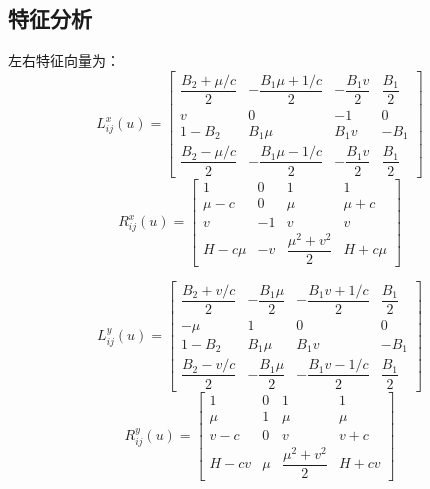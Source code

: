 \documentclass{article}
\numberwithin{equation}{section}    %
\begin{document}
\subsection{特征分析}

左右特征向量为\cite{RN95}：
\begin{equation}
    L_{i j}^{x}(u)=\begin{bmatrix}
        \dfrac{B_{2}+\mu / c}{2} & -\dfrac{B_{1} \mu+1 / c}{2} & -\dfrac{B_{1} v}{2} & \dfrac{B_{1}}{2} \\
        v                        & 0                           & -1                  & 0                \\
        1-B_{2}                  & B_{1} \mu                   & B_{1} v             & -B_{1}           \\
        \dfrac{B_{2}-\mu / c}{2} & -\dfrac{B_{1} \mu-1 / c}{2} & -\dfrac{B_{1} v}{2} & \dfrac{B_{1}}{2}
    \end{bmatrix}
\end{equation}
\begin{equation}
    R_{i j}^{x}(u)=\begin{bmatrix}
        1       & 0  & 1                        & 1       \\
        \mu-c   & 0  & \mu                      & \mu+c   \\
        v       & -1 & v                        & v       \\
        H-c \mu & -v & \dfrac{\mu^{2}+v^{2}}{2} & H+c \mu
    \end{bmatrix}
\end{equation}

\begin{equation}
    L_{i j}^{y}(u)=\begin{bmatrix}
        \dfrac{B_{2}+v / c}{2} & -\dfrac{B_{1} \mu}{2} & -\dfrac{B_{1} v+1 / c}{2} & \dfrac{B_{1}}{2} \\
        -\mu                   & 1                     & 0                         & 0                \\
        1-B_{2}                & B_{1} \mu             & B_{1} v                   & -B_{1}           \\
        \dfrac{B_{2}-v / c}{2} & -\dfrac{B_{1} \mu}{2} & -\dfrac{B_{1} v-1 / c}{2} & \dfrac{B_{1}}{2}
    \end{bmatrix}
\end{equation}
\begin{equation}
    R_{i j}^{y}(u)=\begin{bmatrix}
        1     & 0   & 1                        & 1     \\
        \mu   & 1   & \mu                      & \mu   \\
        v-c   & 0   & v                        & v+c   \\
        H-c v & \mu & \dfrac{\mu^{2}+v^{2}}{2} & H+c v
    \end{bmatrix}
\end{equation}
\end{document}
